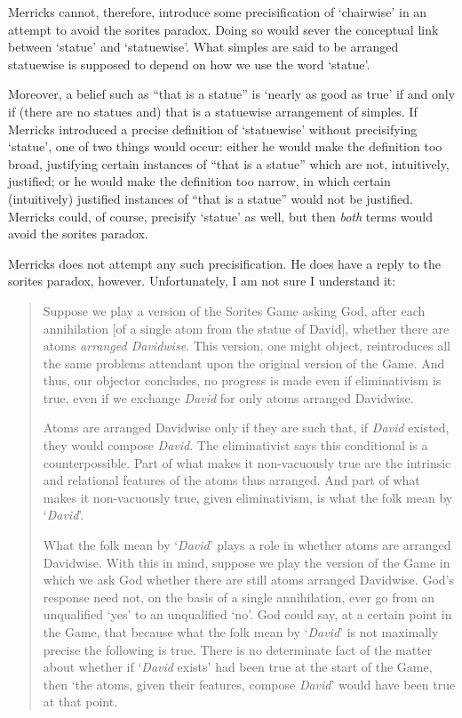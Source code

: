 \documentclass[11pt]{article}
\newenvironment{squote}{%
	\begin{quote}\begin{singlespace}%
	}{%
	\end{singlespace}\end{quote}}
\begin{document}
\begin{spacing}{1.5}
Merricks cannot, therefore, introduce some precisification of
`chairwise' in an attempt to avoid the sorites paradox.  Doing so
would sever the conceptual link between `statue' and `statuewise'.
What simples are said to be arranged statuewise is supposed to depend
on how we use the word `statue'.

Moreover, a belief such as ``that is a statue'' is `nearly as good as
true' if and only if (there are no statues and) that is a statuewise
arrangement of simples.  If Merricks introduced a precise definition
of `statuewise' without precisifying `statue', one of two things would
occur: either he would make the definition too broad, justifying
certain instances of ``that is a statue'' which are not, intuitively,
justified; or he would make the definition too narrow, in which
certain (intuitively) justified instances of ``that is a statue''
would not be justified.  Merricks could, of course, precisify `statue'
as well, but then {\em both} terms would avoid the sorites paradox.

Merricks does not attempt any such precisification.  He does have a
reply to the sorites paradox, however. Unfortunately, I am not sure I
understand it:

\begin{squote}
Suppose we play a version of the Sorites Game asking God, after each
annihilation [of a single atom from the statue of David], whether
there are atoms {\em arranged Davidwise}.  This version, one might
object, reintroduces all the same problems attendant upon the original
version of the Game.  And thus, our objector concludes, no progress is
made even if eliminativism is true, even if we exchange {\em David}
for only atoms arranged Davidwise.  

Atoms are arranged Davidwise only if they are such that, if {\em
  David} existed, they would compose {\em David}.  The eliminativist
says this conditional is a counterpossible. Part of what makes it
non-vacuously true are the intrinsic and relational features of the
atoms thus arranged.  And part of what makes it non-vacuously true,
given eliminativism, is what the folk mean by `{\em David}'.

What the folk mean by `{\em David}' plays a role in whether atoms are
arranged Davidwise.  With this in mind, suppose we play the version of
the Game in which we ask God whether there are still atoms arranged
Davidwise.  God's response need not, on the basis of a single
annihilation, ever go from an unqualified `yes' to an unqualified
`no'. God could say, at a certain point in the Game, that because what
the folk mean by `{\em David}' is not maximally precise the following
is true.  There is no determinate fact of the matter about whether if
`{\em David} exists' had been true at the start of the Game, then `the
atoms, given their features, compose {\em David}' would have been true
at that point.


\end{squote}
\end{spacing}
\end{document}
